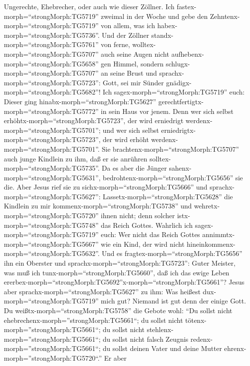 Ungerechte, Ehebrecher, oder auch wie dieser Zöllner.  Ich
fastex-morph=``strongMorph:TG5719'' zweimal in der Woche und gebe den
Zehntenx-morph=``strongMorph:TG5719'' von allem, was ich
habex-morph=``strongMorph:TG5736''.  Und der Zöllner
standx-morph=``strongMorph:TG5761'' von ferne,
wolltex-morph=``strongMorph:TG5707'' auch seine Augen nicht
aufhebenx-morph=``strongMorph:TG5658'' gen Himmel, sondern
schlugx-morph=``strongMorph:TG5707'' an seine Brust und
sprachx-morph=``strongMorph:TG5723'': Gott, sei mir Sünder
gnädigx-morph=``strongMorph:TG5682''!  Ich
sagex-morph=``strongMorph:TG5719'' euch: Dieser ging
hinabx-morph=``strongMorph:TG5627''
gerechtfertigtx-morph=``strongMorph:TG5772'' in sein Haus vor jenem.
Denn wer sich selbst erhöhtx-morph=``strongMorph:TG5723'', der wird
erniedrigt werdenx-morph=``strongMorph:TG5701''; und wer sich selbst
erniedrigtx-morph=``strongMorph:TG5723'', der wird erhöht
werdenx-morph=``strongMorph:TG5701''.  Sie
brachtenx-morph=``strongMorph:TG5707'' auch junge Kindlein zu ihm, daß
er sie anrühren solltex-morph=``strongMorph:TG5735''. Da es aber die
Jünger sahenx-morph=``strongMorph:TG5631'',
bedrohtenx-morph=``strongMorph:TG5656'' sie die.  Aber
Jesus rief sie zu sichx-morph=``strongMorph:TG5666'' und
sprachx-morph=``strongMorph:TG5627'':
Lassetx-morph=``strongMorph:TG5628'' die Kindlein zu mir
kommenx-morph=``strongMorph:TG5738'' und
wehretx-morph=``strongMorph:TG5720'' ihnen nicht; denn solcher
istx-morph=``strongMorph:TG5748'' das Reich Gottes. 
Wahrlich ich sagex-morph=``strongMorph:TG5719'' euch: Wer nicht das
Reich Gottes annimmtx-morph=``strongMorph:TG5667'' wie ein Kind, der
wird nicht hineinkommenx-morph=``strongMorph:TG5632''.  Und
es fragtex-morph=``strongMorph:TG5656'' ihn ein Oberster und
sprachx-morph=``strongMorph:TG5723'': Guter Meister, was muß ich
tunx-morph=``strongMorph:TG5660'', daß ich das ewige Leben
ererbex-morph=``strongMorph:TG5692''\textbar x-morph=``strongMorph:TG5661''?
 Jesus aber sprachx-morph=``strongMorph:TG5627'' zu ihm:
Was heißest dux-morph=``strongMorph:TG5719'' mich gut? Niemand ist gut
denn der einige Gott.  Du
weißtx-morph=``strongMorph:TG5758'' die Gebote wohl: ``Du sollst nicht
ehebrechenx-morph=''strongMorph:TG5661``; du sollst nicht
tötenx-morph=''strongMorph:TG5661``; du sollst nicht
stehlenx-morph=''strongMorph:TG5661``; du sollst nicht falsch Zeugnis
redenx-morph=''strongMorph:TG5661``; du sollst deinen Vater und deine
Mutter ehrenx-morph=''strongMorph:TG5720``.''  Er aber
